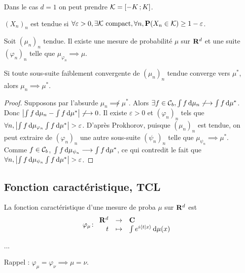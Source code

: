 	Dans le cas $d = 1$ on peut prendre $\mathcal{K} = \mathopen{}\mathclose{\left[-K\mathclose{}\mathpunct{};K\right]}$.
	
	\begin{defn}
		$(X_n)_n$ est tendue si $\forall \varepsilon > 0, \exists \mathcal{K} \ \text{compact}, \forall n, \mathbf{P}(X_n \in \mathcal{K}) \geq 1 - \varepsilon$.
	\end{defn}

	\begin{thm}[de Prokhorov]
		Soit $(\mu_n)_n$ tendue.
		Il existe une mesure de probabilité $\mu$ sur $\mathbf{R}^d$ et une suite $(\varphi_n)_n$ telle que $\mu_{\varphi_n} \implies \mu$.
	\end{thm}

	\begin{pop}
		Si toute sous-suite faiblement convergente de $(\mu_n)_n$ tendue converge vers $\mu^*$, alors $\mu_n \implies \mu^*$.
	\end{pop}

	\begin{proof}
		Supposons par l'absurde $\mu_n \not\implies \mu^*$.
		Alors $\exists f \in \mathcal{C}_b, \int f \mathop{}\mathopen{}\mathrm{d} \mu_n \not\longrightarrow \int f \mathop{}\mathopen{}\mathrm{d} \mu^*$.
		Donc $\left\lvert\int f \mathop{}\mathopen{}\mathrm{d} \mu_n - \int f \mathop{}\mathopen{}\mathrm{d} \mu^*\right\rvert \not\longrightarrow 0$.
		Il existe $\varepsilon > 0$ et $(\varphi_n)_n$ tels que $\forall n, \left\lvert\int f \mathop{}\mathopen{}\mathrm{d} \mu_{\varphi_n} \int f \mathop{}\mathopen{}\mathrm{d} \mu^*\right\rvert > \varepsilon$.
		D'après Prokhorov, puisque $(\mu_n)_n$ est tendue, on peut extraire de $(\varphi_n)_n$ une autre sous-suite $(\psi_n)_n$ telle que $\mu_{\psi_n} \implies \mu^*$.
		Comme $f \in \mathcal{C}_b$, $\int f \mathop{}\mathopen{}\mathrm{d} \mu_{\psi_n} \longrightarrow \int f \mathop{}\mathopen{}\mathrm{d} \mu^*$, ce qui contredit le fait que $\forall n, \left\lvert\int f \mathop{}\mathopen{}\mathrm{d} \mu_{\psi_n} \int f \mathop{}\mathopen{}\mathrm{d} \mu^*\right\rvert > \varepsilon$.
	\end{proof}


\subsection{Fonction caractéristique, TCL}

	La fonction caractéristique d'une mesure de proba $\mu$ sur $\mathbf{R}^d$ est
	$$\varphi_\mu \colon \begin{array}{rcl}
		\mathbf{R}^d & \to & \mathbf{C} \\
		t & \mapsto & \int e^{i \left\langle t \mid x \right\rangle} \mathop{}\mathopen{}\mathrm{d} \mu(x)
	\end{array}$$

	...
	
	Rappel : $\varphi_\mu = \varphi_\nu \implies \mu = \nu$.

